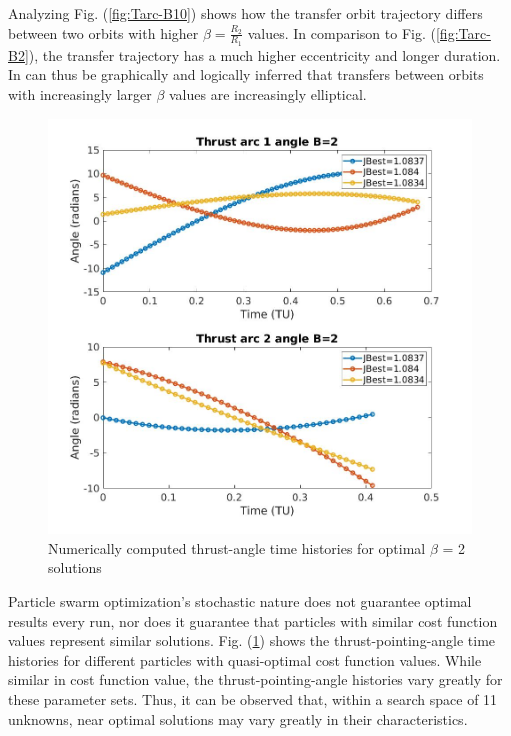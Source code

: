 \noindent Analyzing Fig. (\ref{fig:Tarc-B10}) shows how the transfer orbit trajectory differs between two orbits 
with higher $\beta = \frac{R_2}{R_1}$ values. In comparison to Fig. (\ref{fig:Tarc-B2}), the transfer trajectory has
a much higher eccentricity and longer duration. In can thus be graphically and logically inferred that transfers between orbits 
with increasingly larger $\beta$ values are increasingly elliptical.

\begin{figure}[H]
\includegraphics[width=\linewidth]{./jpgs/thrustAnglesB2.jpg}
\caption{Numerically computed thrust-angle time histories for optimal $\beta$ = 2 solutions  }
\label{fig:thrustAnglesB2}
\end{figure}

\noindent Particle swarm optimization's stochastic nature does not guarantee optimal results every 
run, nor does it guarantee that particles with similar cost function values represent similar solutions. 
Fig. (\ref{fig:thrustAnglesB2}) shows the thrust-pointing-angle time histories for 
different particles with quasi-optimal cost function values. While similar in cost function value, the 
thrust-pointing-angle histories vary greatly for these parameter sets. Thus, it can be observed that, within a search 
space of 11 unknowns, near optimal solutions may vary greatly in their characteristics.

